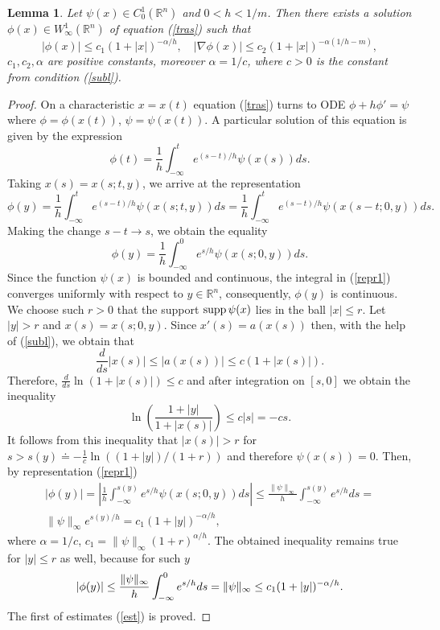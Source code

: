 \documentclass[12pt]{article}
\newcommand{\R}{{\mathbb R}}
\newcommand{\supp}{\mathop{\rm supp}}
\numberwithin{equation}{section}
\theoremstyle{plain}
\newtheorem{lemma}{Lemma}[section]
\theoremstyle{definition}
\begin{document}
\begin{lemma}\label{lm1}
Let $\psi(x)\in C_0^1(\R^n)$ and $0<h<1/m$. Then there exists a solution $\phi(x)\in W_\infty^1(\R^n)$ of equation (\ref{tras}) such that
\begin{equation}\label{est}
|\phi(x)|\le c_1(1+|x|)^{-\alpha/h}, \quad |\nabla\phi(x)|\le c_2(1+|x|)^{-\alpha(1/h-m)},
\end{equation}
$c_1,c_2,\alpha$ are positive constants, moreover $\alpha=1/c$, where $c>0$ is the constant from condition (\ref{subl}).
\end{lemma}

\begin{proof}
On a characteristic $x=x(t)$ equation (\ref{tras}) turns to ODE  $\phi+h\phi'=\psi$ where $\phi=\phi(x(t))$, $\psi=\psi(x(t))$. A particular solution of this equation is given by the expression
\[
\phi(t)=\frac{1}{h}\int_{-\infty}^t e^{(s-t)/h}\psi(x(s))ds.
\]
Taking $x(s)=x(s;t,y)$, we arrive at the representation
\[
\phi(y)=\frac{1}{h}\int_{-\infty}^t e^{(s-t)/h}\psi(x(s;t,y))ds=\frac{1}{h}\int_{-\infty}^t e^{(s-t)/h}\psi(x(s-t;0,y))ds.
\]
Making the change $s-t\to s$, we obtain the equality
\begin{equation}\label{repr1}
\phi(y)=\frac{1}{h}\int_{-\infty}^0 e^{s/h}\psi(x(s;0,y))ds.
\end{equation}
Since the function $\psi(x)$ is bounded and continuous, the integral in (\ref{repr1}) converges uniformly with respect to  $y\in\R^n$, consequently, $\phi(y)$ is continuous. We choose such $r>0$ that the support $\supp\psi(x)$ lies in the ball $|x|\le r$. Let $|y|>r$ and $x(s)=x(s;0,y)$. Since $x'(s)=a(x(s))$ then, with the help of (\ref{subl}), we obtain that
\[
\frac{d}{ds}|x(s)|\le |a(x(s))|\le c(1+|x(s)|).
\]
Therefore, $\frac{d}{ds}\ln(1+|x(s)|)\le c$ and after integration on $[s,0]$ we obtain the inequality
\[
\ln\left(\frac{1+|y|}{1+|x(s)|}\right)\le c|s|=-cs.
\]
It follows from this inequality that $|x(s)|>r$ for $s>s(y)\doteq-\frac{1}{c}\ln((1+|y|)/(1+r))$ and therefore  $\psi(x(s))=0$. Then, by representation (\ref{repr1})
\begin{align*}
|\phi(y)|=\left|\frac{1}{h}\int_{-\infty}^{s(y)} e^{s/h}\psi(x(s;0,y))ds\right|\le \frac{\|\psi\|_\infty}{h}\int_{-\infty}^{s(y)} e^{s/h}ds=\\ \|\psi\|_\infty e^{s(y)/h}=c_1(1+|y|)^{-\alpha/h},
\end{align*}
where $\alpha=1/c$, $c_1=\|\psi\|_\infty(1+r)^{\alpha/h}$. The obtained inequality remains true for $|y|\le r$ as well, because for such $y$
\[
|\phi(y)|\le \frac{\|\psi\|_\infty}{h}\int_{-\infty}^0 e^{s/h}ds=\\ \|\psi\|_\infty\le c_1(1+|y|)^{-\alpha/h}.
\]
The first of estimates (\ref{est}) is proved.


\end{proof}
\end{document}
